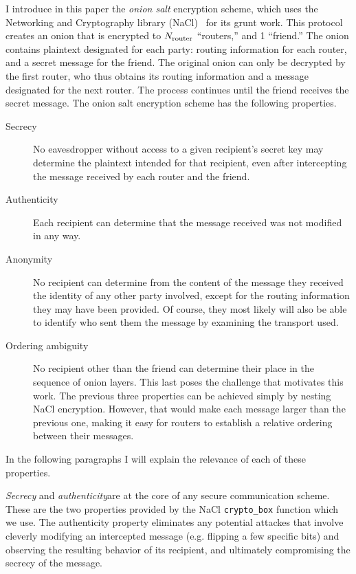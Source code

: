 \documentclass[letterpaper,twocolumn,amsmath,amssymb,pre,aps,10pt]{revtex4-1}
\begin{document}
I introduce in this paper the \emph{onion salt} encryption scheme,
which uses the Networking and Cryptography library
(NaCl)~\cite{bernstein2009cryptography} for its grunt work.  This
protocol creates an onion that is encrypted to $N_{\text{router}}$ ``routers,''
and 1 ``friend.''  The onion contains plaintext designated for each
party: routing information for each router, and a secret message for
the friend.  The original onion can only be decrypted by the first
router, who thus obtains its routing information and a message
designated for the next router.  The process continues until the
friend receives the secret message.  The onion salt encryption scheme
has the following properties.
\begin{description}
\item[Secrecy] No eavesdropper without access to a given recipient's
  secret key may determine the plaintext intended for that recipient,
  even after intercepting the message received by each router and the
  friend.
\item[Authenticity] Each recipient can determine that the message
  received was not modified in any way.
\item[Anonymity] No recipient can determine from the content of the
  message they received the identity of any other party involved,
  except for the routing information they may have been provided.  Of
  course, they most likely will also be able to identify who sent them
  the message by examining the transport used.
\item[Ordering ambiguity] No recipient other than the friend can determine
  their place in the sequence of onion layers.  This last poses the
  challenge that motivates this work.  The previous three properties
  can be achieved simply by nesting NaCl encryption.  However, that
  would make each message larger than the previous one, making it easy
  for routers to establish a relative ordering between their messages.
\end{description}
In the following paragraphs I will explain the relevance of each of
these properties.

\emph{Secrecy} and \emph{authenticity}are at the core of any secure
communication scheme.  These are the two properties provided by the
NaCl \verb!crypto_box! function which we use. The authenticity
property eliminates any potential attackes that involve cleverly
modifying an intercepted message (e.g. flipping a few specific bits)
and observing the resulting behavior of its recipient, and ultimately
compromising the secrecy of the message.
\end{document}

